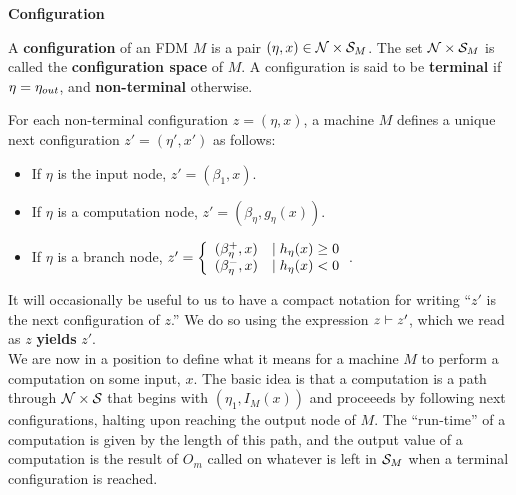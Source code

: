 \begin{definition}{\textbf{Configuration}}  

  A \textbf{configuration} of an FDM $M$ is a pair $(\eta, x) \in
  \mathcal{N} \times \mathcal{S}_M$. The set $\mathcal{N} \times \mathcal{S}_M$
  is called the \textbf{configuration space} of $M$.  A configuration
  is said to be \textbf{terminal} if $\eta = \eta_{out}$, and
  \textbf{non-terminal} otherwise.

\end{definition}

For each non-terminal configuration $z = (\eta, x)$, a machine $M$
defines a unique next configuration $z' = (\eta', x')$ as follows:

\begin{itemize}
\item If $\eta$ is the input node, $z' = (\beta_{1}, x)$.
\item If $\eta$ is a computation node, $z' = (\beta_{\eta}, g_\eta(x))$.
\item If $\eta$ is a branch node, $z' = \left\{ \begin{array}{ll} (\beta_\eta^+,
    x) & \mid h_\eta(x) \geq 0 \\ (\beta_\eta^-, x) & \mid h_\eta(x) < 0 \end{array} \right.$.
\end{itemize}

It will occasionally be useful to us to have a compact notation for
writing ``$z'$ is the next configuration of $z$.''  We do so using the
expression $z \vdash z'$, which we read as $z$ \textbf{yields} $z'$.\\

We are now in a position to define what it means for a machine $M$ to
perform a computation on some input, $x$.  The basic idea is that a
computation is a path through $\mathcal{N} \times \mathcal{S}$ that begins
with $(\eta_1, I_M(x))$ and proceeeds by following next
configurations, halting upon reaching the output node of $M$.  The
``run-time'' of a computation is given by the length of this path, and
the output value of a computation is the result of $O_m$ called on
whatever is left in $\mathcal{S}_M$ when a terminal configuration is
reached.\\

